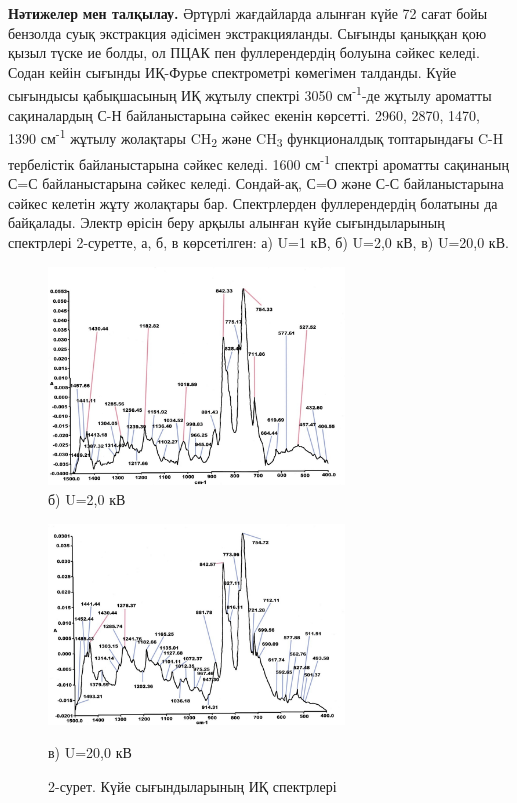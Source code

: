 \begin{multicols}{2}
{\bfseries Нәтижелер} {\bfseries мен талқылау.} Әртүрлі жағдайларда алынған
күйе 72 сағат бойы бензолда суық экстракция әдісімен экстракцияланды.
Сығынды қаныққан қою қызыл түске ие болды, ол ПЦАК пен фуллерендердің
болуына сәйкес келеді. Содан кейін сығынды ИҚ-Фурье спектрометрі
көмегімен талданды. Күйе сығындысы қабықшасының ИҚ жұтылу спектрі 3050
см\textsuperscript{-1}-де жұтылу ароматты сақиналардың С-Н
байланыстарына сәйкес екенін көрсетті. 2960, 2870, 1470, 1390
см\textsuperscript{-1} жұтылу жолақтары CH\textsubscript{2} және
CH\textsubscript{3} функционалдық топтарындағы C-H тербелістік
байланыстарына сәйкес келеді. 1600 см\textsuperscript{-1} спектрі
ароматты сақинаның С=С байланыстарына сәйкес келеді. Сондай-ақ, С=О және
С-С байланыстарына сәйкес келетін жұту жолақтары бар. Спектрлерден
фуллерендердің болатыны да байқалады. Электр өрісін беру арқылы алынған
күйе сығындыларының спектрлері 2-суретте, а, б, в көрсетілген: а) U=1
кВ, б) U=2,0 кВ, в) U=20,0 кВ.
\end{multicols}

\begin{figure}[H]
	\centering
	\includegraphics[width=0.7\textwidth]{assets/25}
	\caption*{б) U=2,0 кВ}
\end{figure}

\begin{figure}[H]
	\centering
	\includegraphics[width=0.7\textwidth]{assets/26}
	\caption*{в) U=20,0 кВ}
	\caption*{2-сурет. Күйе сығындыларының ИҚ спектрлері}
\end{figure}

